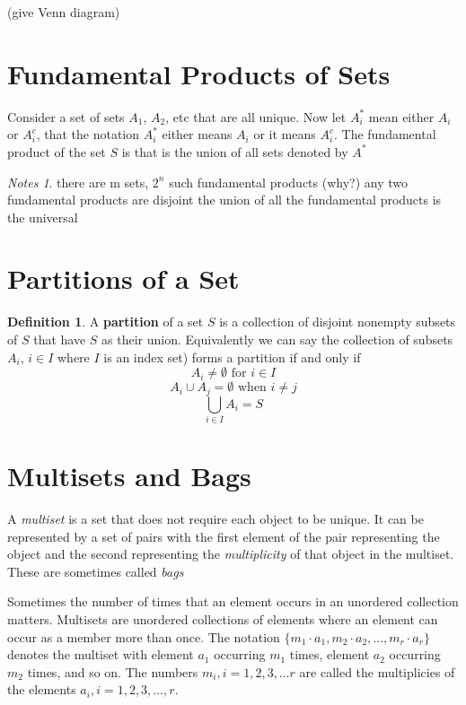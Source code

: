 \documentclass[11pt]{book} %
\theoremstyle {definition}
\newtheorem {definition}{Definition}[section]
\theoremstyle {remark}
\newtheorem*{notes}{Notes}
\begin{document}
(give Venn diagram)



\section {Fundamental Products of Sets}
Consider a set of sets $A_1$, $A_2$, etc that are all unique. 
Now let $A_i^*$ mean either $A_i$ or  $A_i^c$, that the notation $A_i^*$ either means $A_i$ or it means $A_i^c$.
The fundamental product of the set $S$ is that is the union of all sets denoted by $A^*$

\begin{notes}
there are m sets, $2^n$ such fundamental products (why?)
any two fundamental products are disjoint
the union of all the fundamental products is the universal
\end{notes}


\section {Partitions of a Set}
\begin{definition}
A \textbf{partition} of a set $S$ is a collection of disjoint nonempty subsets of $S$ that have $S$ as their union. Equivalently we can say the collection of subsets $A_i$, $i \in I$ where $I$ is an index set) forms a partition if and only if
$$A_i \neq \emptyset \text{  for  } i \in I$$
$$A_i \cup A_j =  \emptyset \text{  when  } i \neq j$$
$$\bigcup_{i \in I} A_i = S$$
\end{definition}

\section {Multisets and Bags}
A \textit{multiset} is a set that does not require each object to be unique. It can be represented by a set of pairs with the first element of the pair representing the object and the second representing the \textit{multiplicity} of that object in the multiset. These are sometimes called \textit{bags}

Sometimes the number of times that an element occurs in an unordered collection matters. Multisets are unordered collections of elements where an element can occur as a member more than once. The notation $\{m_1 \cdot a_1, m_2 \cdot a_2, \dots ,m_r \cdot a_r\}$ denotes the multiset with element $a_1$ occurring $m_1$ times, element $a_2$ occurring $m_2$ times, and so on. The numbers $m_i, i=1,2,3, \dots r$ are called the multiplicies of the elements $a_i, i=1,2,3, \dots ,r$.
\end{document}
